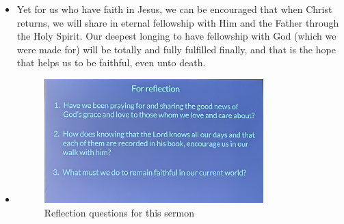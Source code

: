 \begin{itemize}
{  emotional torment described is just a way for us to scratch the surface of
  the depth of this torment.}
  \item{Yet for us who have faith in Jesus, we can be encouraged that when
  Christ returns, we will share in eternal fellowship with Him and the Father
  through the Holy Spirit.  Our deepest longing to have fellowship with God
  (which we were made for) will be totally and fully fulfilled finally, and
  that is the hope that helps us to be faithful, even unto death.  }
  \item{\begin{figure}[H]
    \centering
    \includegraphics[width=0.8\textwidth, trim={0cm 0cm 0cm 0cm},clip]{Figures/aprilSermon5Reflections.jpg}
    \caption[]{Reflection questions for this sermon}
    \label{}
  \end{figure}}
\end{itemize}